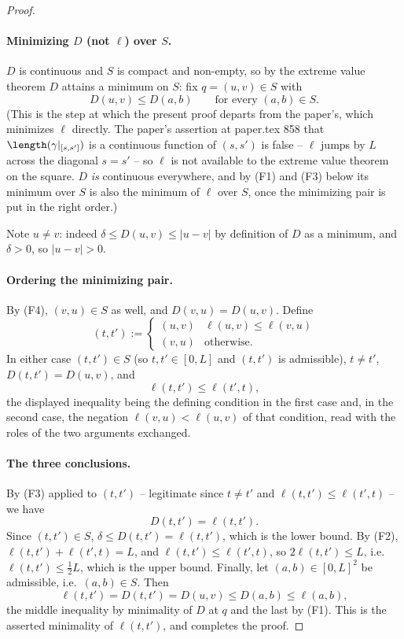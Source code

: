 \begin{proof}
  \paragraph{Minimizing $D$ (not $\ell$) over $S$.} $D$ is continuous and $S$ is compact and
  non-empty, so by the extreme value theorem $D$ attains a minimum on $S$: fix $q = (u,v) \in S$
  with
  \[
    D(u,v) \le D(a,b) \qquad \text{for every } (a,b) \in S
    .
  \]
  (This is the step at which the present proof departs from the paper's, which minimizes
  $\ell$ directly. The paper's assertion at paper.tex 858 that $\length(\gamma|_{[s,s']})$ is a
  continuous function of $(s,s')$ is false -- $\ell$ jumps by $L$ across the diagonal $s=s'$ --
  so $\ell$ is not available to the extreme value theorem on the square. $D$ \emph{is} continuous
  everywhere, and by (F1) and (F3) below its minimum over $S$ is also the minimum of $\ell$ over
  $S$, once the minimizing pair is put in the right order.)

  Note $u \ne v$: indeed $\delta \le D(u,v) \le |u-v|$ by definition of $D$ as a minimum, and
  $\delta > 0$, so $|u-v| > 0$.

  \paragraph{Ordering the minimizing pair.} By (F4), $(v,u) \in S$ as well, and $D(v,u) = D(u,v)$.
  Define
  \[
    (t,t') := \begin{cases} (u,v) & \ell(u,v) \le \ell(v,u) \\ (v,u) & \text{otherwise.}\end{cases}
  \]
  In either case $(t,t') \in S$ (so $t,t' \in [0,L]$ and $(t,t')$ is admissible), $t \ne t'$,
  $D(t,t') = D(u,v)$, and
  \[
    \ell(t,t') \le \ell(t',t)
    ,
  \]
  the displayed inequality being the defining condition in the first case and, in the second case,
  the negation $\ell(v,u) < \ell(u,v)$ of that condition, read with the roles of the two arguments
  exchanged.

  \paragraph{The three conclusions.} By (F3) applied to $(t,t')$ -- legitimate since $t \ne t'$ and
  $\ell(t,t') \le \ell(t',t)$ -- we have
  \[
    D(t,t') = \ell(t,t')
    .
  \]
  Since $(t,t') \in S$, $\delta \le D(t,t') = \ell(t,t')$, which is the lower bound. By (F2),
  $\ell(t,t') + \ell(t',t) = L$, and $\ell(t,t') \le \ell(t',t)$, so $2\ell(t,t') \le L$, i.e.\
  $\ell(t,t') \le \tfrac12 L$, which is the upper bound. Finally, let $(a,b) \in [0,L]^2$ be
  admissible, i.e.\ $(a,b) \in S$. Then
  \[
    \ell(t,t') = D(t,t') = D(u,v) \le D(a,b) \le \ell(a,b)
    ,
  \]
  the middle inequality by minimality of $D$ at $q$ and the last by (F1). This is the asserted
  minimality of $\ell(t,t')$, and completes the proof.
\end{proof}
